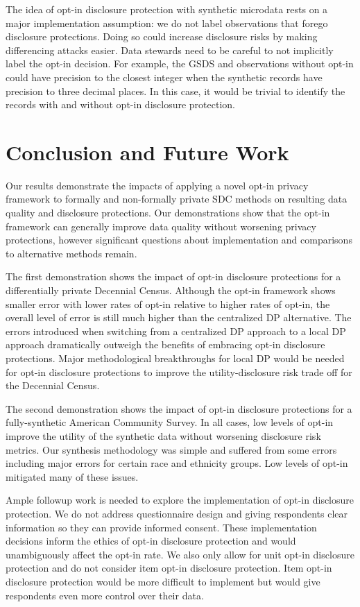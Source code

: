 \documentclass[
]{urban-formatting}
\begin{document}
The idea of opt-in disclosure protection with synthetic microdata rests
on a major implementation assumption: we do not label observations that
forego disclosure protections. Doing so could increase disclosure risks
by making differencing attacks easier. Data stewards need to be careful
to not implicitly label the opt-in decision. For example, the GSDS and
observations without opt-in could have precision to the closest integer
when the synthetic records have precision to three decimal places. In
this case, it would be trivial to identify the records with and without
opt-in disclosure protection.

\section{Conclusion and Future Work}

Our results demonstrate the impacts of applying a novel opt-in privacy
framework to formally and non-formally private SDC methods on resulting
data quality and disclosure protections. Our demonstrations show that
the opt-in framework can generally improve data quality without
worsening privacy protections, however significant questions about
implementation and comparisons to alternative methods remain.

The first demonstration shows the impact of opt-in disclosure
protections for a differentially private Decennial Census. Although the
opt-in framework shows smaller error with lower rates of opt-in relative
to higher rates of opt-in, the overall level of error is still much
higher than the centralized DP alternative. The errors introduced when
switching from a centralized DP approach to a local DP approach
dramatically outweigh the benefits of embracing opt-in disclosure
protections. Major methodological breakthroughs for local DP would be
needed for opt-in disclosure protections to improve the
utility-disclosure risk trade off for the Decennial Census.

The second demonstration shows the impact of opt-in disclosure
protections for a fully-synthetic American Community Survey. In all
cases, low levels of opt-in improve the utility of the synthetic data
without worsening disclosure risk metrics. Our synthesis methodology was
simple and suffered from some errors including major errors for certain
race and ethnicity groups. Low levels of opt-in mitigated many of these
issues.

Ample followup work is needed to explore the implementation of opt-in
disclosure protection. We do not address questionnaire design and giving
respondents clear information so they can provide informed consent.
These implementation decisions inform the ethics of opt-in disclosure
protection and would unambiguously affect the opt-in rate. We also only
allow for unit opt-in disclosure protection and do not consider item
opt-in disclosure protection. Item opt-in disclosure protection would be
more difficult to implement but would give respondents even more control
over their data.
\end{document}
